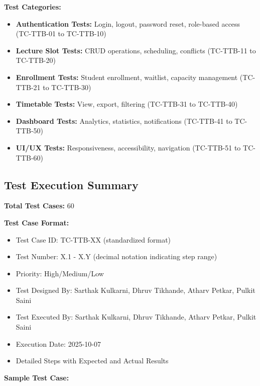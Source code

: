 \textbf{Test Categories:}
\begin{itemize}[leftmargin=*]
    \item \textbf{Authentication Tests:} Login, logout, password reset, role-based access (TC-TTB-01 to TC-TTB-10)
    \item \textbf{Lecture Slot Tests:} CRUD operations, scheduling, conflicts (TC-TTB-11 to TC-TTB-20)
    \item \textbf{Enrollment Tests:} Student enrollment, waitlist, capacity management (TC-TTB-21 to TC-TTB-30)
    \item \textbf{Timetable Tests:} View, export, filtering (TC-TTB-31 to TC-TTB-40)
    \item \textbf{Dashboard Tests:} Analytics, statistics, notifications (TC-TTB-41 to TC-TTB-50)
    \item \textbf{UI/UX Tests:} Responsiveness, accessibility, navigation (TC-TTB-51 to TC-TTB-60)
\end{itemize}

\subsection{Test Execution Summary}

\textbf{Total Test Cases:} 60

\textbf{Test Case Format:}
\begin{itemize}[leftmargin=*]
    \item Test Case ID: TC-TTB-XX (standardized format)
    \item Test Number: X.1 - X.Y (decimal notation indicating step range)
    \item Priority: High/Medium/Low
    \item Test Designed By: Sarthak Kulkarni, Dhruv Tikhande, Atharv Petkar, Pulkit Saini
    \item Test Executed By: Sarthak Kulkarni, Dhruv Tikhande, Atharv Petkar, Pulkit Saini
    \item Execution Date: 2025-10-07
    \item Detailed Steps with Expected and Actual Results
\end{itemize}

\textbf{Sample Test Case:}

